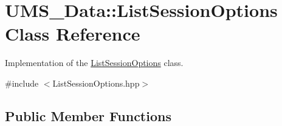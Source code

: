 \hypertarget{classUMS__Data_1_1ListSessionOptions}{
\section{UMS\_\-Data::ListSessionOptions Class Reference}
\label{classUMS__Data_1_1ListSessionOptions}
}


Implementation of the \hyperlink{classUMS__Data_1_1ListSessionOptions}{ListSessionOptions} class.  




{\ttfamily \#include $<$ListSessionOptions.hpp$>$}

\subsection*{Public Member Functions}
